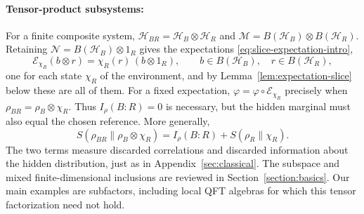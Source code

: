 \documentclass[a4paper,11pt]{article}
\theoremstyle{definition}
\newcommand{\mR}{\mathcal{R}}
\newcommand{\mN}{\mathcal{N}}
\newcommand{\mH}{\mathcal{H}}
\newcommand{\mM}{\mathcal{M}}
\newcommand{\mE}{\mathcal{E}}
\begin{document}
\paragraph{Tensor-product subsystems:}
For a finite composite system, $\mathcal H_{BR}=\mH_B\otimes\mH_R$ and
$\mM=B(\mathcal H_B)\otimes B(\mathcal H_R)$. Retaining $\mN=B(\mathcal H_B)\otimes1_R$ gives the expectations \eqref{eq:slice-expectation-intro},
\begin{equation}\label{condexp}
 \mE_{\chi_R}(b\otimes r)=\chi_R(r)\,(b\otimes1_R),
 \qquad b\in B(\mathcal H_B),\quad r\in B(\mathcal H_R),
\end{equation}
one for each state $\chi_R$ of the environment, and by Lemma~\ref{lem:expectation-slice} below these are all of them.
For a fixed expectation, $\varphi=\varphi\circ\mE_{\chi_R}$ precisely when
$\rho_{BR}=\rho_B\otimes\chi_R$. Thus $I_\rho(B:R)=0$ is necessary, but the hidden
marginal must also equal the chosen reference. More generally,
\begin{equation}\label{eq:quantum-coarse-entropy-decomposition}
 S(\rho_{BR}\|\rho_B\otimes\chi_R)
 =I_\rho(B:R)+S(\rho_R\|\chi_R).
\end{equation}
The two terms measure discarded correlations and discarded information about the
hidden distribution, just as in Appendix~\ref{sec:classical}.
The subspace and mixed finite-dimensional inclusions are reviewed in
Section~\ref{section:basics}. Our main examples are subfactors, including
local QFT algebras for which this tensor factorization need not hold.
\end{document}
